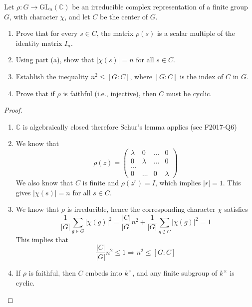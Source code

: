 \begin{prob}[F2009-Q6, F2001-Q5]
    Let \( \rho \colon G \to \mathrm{GL}_n(\mathbb{C}) \) be an irreducible complex representation of a finite group \( G \), with character \( \chi \), and let \( C \) be the center of \( G \).
    
    \begin{enumerate}
        \item Prove that for every \( s \in C \), the matrix \( \rho(s) \) is a scalar multiple of the identity matrix \( I_n \).
        
        \item Using part (a), show that \( |\chi(s)| = n \) for all \( s \in C \).
        
        \item Establish the inequality \( n^2 \leq [G : C] \), where \( [G : C] \) is the index of \( C \) in \( G \).
        
        \item Prove that if \( \rho \) is faithful (i.e., injective), then \( C \) must be cyclic.
    \end{enumerate}
\end{prob}



\begin{proof}
    \begin{enumerate}
        \item $\mathbb{C}$ is algebraically closed therefore Schur's lemma applies (see F2017-Q6)
        \item We know that 
        \begin{equation*}
            \rho(z)=\begin{pmatrix}
                \lambda&0&\dots&0\\
                0&\lambda&\dots&0\\
                \dots\\
                0&\dots&0&\lambda
            \end{pmatrix}
        \end{equation*}
        We also know that $C$ is finite and $\rho(z^r)=I$, which implies $|r|=1$. This gives $|\chi(s)|=n$ for all $s\in C$. 
        \item We know that $\rho$ is irreducible, hence the corresponding character $\chi$ satisfies 
        \begin{equation*}
            \frac{1}{|G|}\sum_{g\in G}|\chi(g)|^2=\frac{|C|}{|G|}n^2+\frac{1}{|G|}\sum_{g\not\in C}|\chi(g)|^2=1
        \end{equation*}
        This implies that 
        \begin{equation*}
            \frac{|C|}{|G|}n^2\leq 1\Rightarrow n^2\leq[G:C]
        \end{equation*}
        \item If $\rho$ is faithful, then $C$ embeds into $k^\times$, and any finite subgroup of $k^\times$ is cyclic.
    \end{enumerate}
\end{proof}

